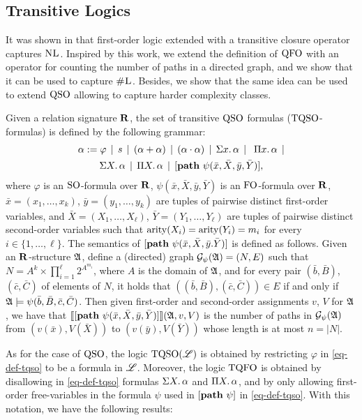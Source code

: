 
\subsection{Transitive Logics}

It was shown in \cite{I86,I88} that first-order logic extended with a transitive closure operator captures $\text{\sc NL}$. Inspired by this work, we extend the definition of ${\rm QFO}$ with an operator for counting the number of paths in a directed graph, and we show that it can be used to capture $\text{\sc \#L}$. Besides, we show that the same idea can be used to extend ${\rm QSO}$ allowing to capture harder complexity classes. 

Given a relation signature $\mathbf{R}$, the set of transitive ${\rm QSO}$ formulas (${\rm TQSO}$-formulas) is defined by the following grammar:
\begin{multline}
	\label{eq-def-tqso}
	\alpha := \varphi \, \mid \, s \, \mid \, (\alpha \add \alpha) \, \mid\, (\alpha \mult \alpha) \, \mid \, 
	\sa{x} \alpha \, \mid\, \
	\pa{x} \alpha \, \mid \\ 
	\sa{X} \alpha \, \mid \, \pa{X} \alpha \, \mid \, [\pth \psi(\bar{x}, \bar{X},\bar{y}, \bar{Y})],
\end{multline}
where $\varphi$ is an ${\rm SO}$-formula over $\mathbf{R}$, $\psi(\bar{x},\bar{X},\bar{y},\bar{Y})$ is an ${\rm FO}$-formula over $\mathbf{R}$, $\bar{x} = (x_1, \ldots, x_k)$, $\bar{y} = (y_1, \ldots, y_k)$ are tuples of pairwise distinct first-order variables, and $\bar{X} = (X_1, \ldots, X_\ell)$, $\bar{Y} = (Y_1, \ldots, Y_\ell)$ are tuples of pairwise distinct second-order variables such that ${\rm arity}(X_i) = {\rm arity}(Y_i) = m_i$ for every $i \in \{1, \ldots, \ell\}$. The semantics of $[{\bf path} \,\, \psi(\bar{x},\bar{X},\bar{y}.\bar{Y})]$ is defined as follows. Given an $\mathbf{R}$-structure $\mathfrak{A}$, define a (directed) graph $\cG_{\psi}(\A) = (N,E)$ such that $N = A^k \times \prod_{i=1}^\ell 2^{A^{m_i}}$, where $A$ is the domain of $\mathfrak{A}$, and for every pair $(\bar b, \bar B)$, $(\bar c, \bar C)$ of elements of $N$, it holds that $((\bar b, \bar B), (\bar c, \bar C)) \in E$ if and only if $\mathfrak{A} \models \psi(\bar b, \bar{B}, \bar c, \bar{C})$. Then given first-order and second-order assignments $v$, $V$ for $\mathfrak{A}$, we have that ${\llbracket{}{[{\bf path} \,\, \psi(\bar{x},\bar{X}, \bar{y}, \bar{Y})]}\rrbracket}(\mathfrak{A},v,V)$ is the number of paths in $\cG_\psi(\A)$ from $(v(\bar x), V(\bar X))$ to $(v(\bar y), V(\bar Y))$ whose length is at most $n = |N|$.

As for the case of ${\rm QSO}$, the logic ${\rm TQSO}(\mathscr{L})$ is obtained by restricting $\varphi$ in \eqref{eq-def-tqso} to be a formula in $\mathscr{L}$. Moreover, the logic ${\rm TQFO}$ is obtained by disallowing in \eqref{eq-def-tqso} formulas $\Sigma{X}.\, \alpha$ and $\Pi{X}.\, \alpha$, and by only allowing  first-order free-variables in the formula $\psi$ used in $[{\bf path} \,\, \psi]$ in \eqref{eq-def-tqso}. With this notation, we have the following results:


